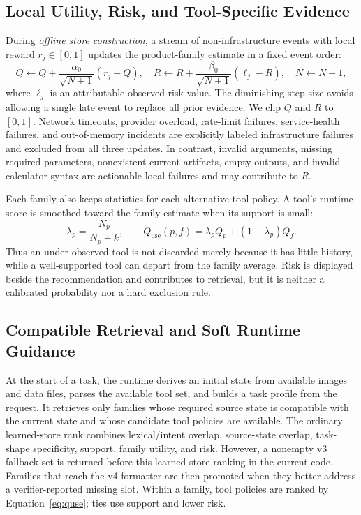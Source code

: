 \documentclass[10pt]{article}
\newcommand{\quse}{Q_{\mathrm{use}}}
\begin{document}
\subsection{Local Utility, Risk, and Tool-Specific Evidence}
During \emph{offline store construction}, a stream of non-infrastructure events with local reward $r_j\in[0,1]$ updates the product-family estimate in a fixed event order:
\begin{equation}
Q\leftarrow Q+\frac{\alpha_0}{\sqrt{N+1}}(r_j-Q),\quad
R\leftarrow R+\frac{\beta_0}{\sqrt{N+1}}(\ell_j-R),\quad N\leftarrow N+1,
\label{eq:stats}
\end{equation}
where $\ell_j$ is an attributable observed-risk value. The diminishing step size avoids allowing a single late event to replace all prior evidence. We clip $Q$ and $R$ to $[0,1]$. Network timeouts, provider overload, rate-limit failures, service-health failures, and out-of-memory incidents are explicitly labeled infrastructure failures and excluded from all three updates. In contrast, invalid arguments, missing required parameters, nonexistent current artifacts, empty outputs, and invalid calculator syntax are actionable local failures and may contribute to $R$.

Each family also keeps statistics for each alternative tool policy. A tool's runtime score is smoothed toward the family estimate when its support is small:
\begin{equation}
\lambda_p=\frac{N_p}{N_p+k},\qquad
\quse(p,f)=\lambda_pQ_p+(1-\lambda_p)Q_f.
\label{eq:quse}
\end{equation}
Thus an under-observed tool is not discarded merely because it has little history, while a well-supported tool can depart from the family average. Risk is displayed beside the recommendation and contributes to retrieval, but it is neither a calibrated probability nor a hard exclusion rule.

\subsection{Compatible Retrieval and Soft Runtime Guidance}
At the start of a task, the runtime derives an initial state from available images and data files, parses the available tool set, and builds a task profile from the request. It retrieves only families whose required source state is compatible with the current state and whose candidate tool policies are available. The ordinary learned-store rank combines lexical/intent overlap, source-state overlap, task-shape specificity, support, family utility, and risk. However, a nonempty v3 fallback set is returned before this learned-store ranking in the current code. Families that reach the v4 formatter are then promoted when they better address a verifier-reported missing slot. Within a family, tool policies are ranked by Equation~\ref{eq:quse}; ties use support and lower risk.
\end{document}
